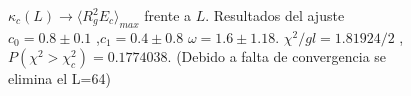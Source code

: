 \begin{figure}[h]
  \centering
  
  \caption{$\kappa_c(L)\rightarrow\langle R_g^2 E_c\rangle_{max}$ frente a $L$. Resultados del ajuste $c_0=0.8\pm 0.1$ ,$c_1=0.4\pm 0.8 $ $\omega=1.6 \pm
    1.18$. $\chi^2/gl=1.81924/2$ , $P(\chi^2>\chi_c^2)=0.1774038$. (Debido a falta de convergencia se elimina el L=64)}







\end{figure}
\clearpage



